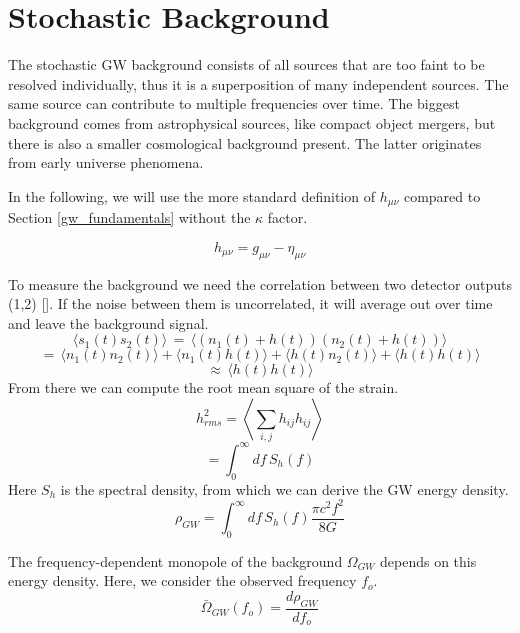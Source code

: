 \section{Stochastic Background}
The stochastic GW background consists of all sources that are too faint to be resolved individually, thus it is a superposition of many independent sources. The same source can contribute to multiple frequencies over time. 
The biggest background comes from astrophysical sources, like compact object mergers, but there is also a smaller cosmological background present. The latter originates from early universe phenomena. 

In the following, we will use the more standard definition of $h_{\mu\nu}$ compared to Section \ref{gw_fundamentals} without the $\kappa$ factor.

\begin{equation}
    h_{\mu\nu} = g_{\mu\nu}-\eta_{\mu\nu}
\end{equation}

To measure the background we need the correlation between two detector outputs (1,2) [\cite{christensen_stochastic_2019}]. If the noise between them is uncorrelated, it will average out over time and leave the background signal.
\begin{equation}
    \langle s_1 (t) s_2(t)\rangle \, = \, \langle(n_1(t) + h(t))(n_2(t) + h(t))\rangle
\end{equation}
\begin{equation}
    = \, \langle n_1(t) n_2(t)\rangle + \langle n_1(t)h(t)\rangle + \langle h(t)n_2(t)\rangle  + \langle h(t)h(t)\rangle  
\end{equation}
\begin{equation}
    \approx \, \langle h(t)h(t)\rangle 
\end{equation}
From there we can compute the root mean square of the strain.
\begin{equation}
    h_{rms}^2 = \left\langle \sum_{i,j} h_{ij} h_{ij}\right\rangle 
\end{equation}
\begin{equation}
    = \int_0^\infty df \, S_h (f)
\end{equation}
Here $S_h$ is the spectral density, from which we can derive the GW energy
density.
\begin{equation}
    \rho_{GW} = \int_0^\infty df \, S_h(f) \frac{\pi c^2 f^2}{8G}
\end{equation} 

The frequency-dependent monopole of the background $\Omega_{GW}$ depends on this energy density. Here, we consider the observed frequency $f_o$.
\begin{equation}
    \bar{\Omega}_{GW}(f_o)=\frac{d\rho_{GW}}{df_o}
\end{equation}

